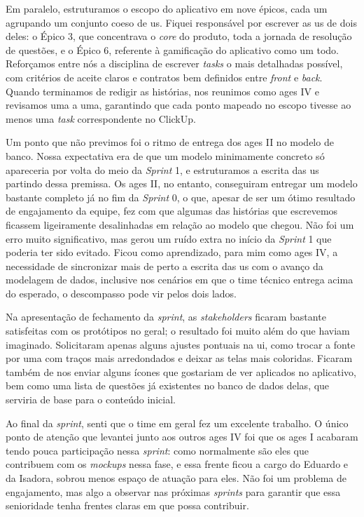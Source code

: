Em paralelo, estruturamos o escopo do aplicativo em nove épicos, cada um agrupando um conjunto coeso de \ac{us}. Fiquei responsável por escrever as \ac{us} de dois deles: o Épico 3, que concentrava o \textit{core} do produto, toda a jornada de resolução de questões, e o Épico 6, referente à gamificação do aplicativo como um todo. Reforçamos entre nós a disciplina de escrever \textit{tasks} o mais detalhadas possível, com critérios de aceite claros e contratos bem definidos entre \textit{front} e \textit{back}. Quando terminamos de redigir as histórias, nos reunimos como \ac{ages} IV e revisamos uma a uma, garantindo que cada ponto mapeado no escopo tivesse ao menos uma \textit{task} correspondente no ClickUp.

Um ponto que não previmos foi o ritmo de entrega dos \ac{ages} II no modelo de banco. Nossa expectativa era de que um modelo minimamente concreto só apareceria por volta do meio da \textit{Sprint} 1, e estruturamos a escrita das \ac{us} partindo dessa premissa. Os \ac{ages} II, no entanto, conseguiram entregar um modelo bastante completo já no fim da \textit{Sprint} 0, o que, apesar de ser um ótimo resultado de engajamento da equipe, fez com que algumas das histórias que escrevemos ficassem ligeiramente desalinhadas em relação ao modelo que chegou. Não foi um erro muito significativo, mas gerou um ruído extra no início da \textit{Sprint} 1 que poderia ter sido evitado. Ficou como aprendizado, para mim como \ac{ages} IV, a necessidade de sincronizar mais de perto a escrita das \ac{us} com o avanço da modelagem de dados, inclusive nos cenários em que o time técnico entrega acima do esperado, o descompasso pode vir pelos dois lados.

Na apresentação de fechamento da \textit{sprint}, as \textit{stakeholders} ficaram bastante satisfeitas com os protótipos no geral; o resultado foi muito além do que haviam imaginado. Solicitaram apenas alguns ajustes pontuais na \ac{ui}, como trocar a fonte por uma com traços mais arredondados e deixar as telas mais coloridas. Ficaram também de nos enviar alguns ícones que gostariam de ver aplicados no aplicativo, bem como uma lista de questões já existentes no banco de dados delas, que serviria de base para o conteúdo inicial.

Ao final da \textit{sprint}, senti que o time em geral fez um excelente trabalho. O único ponto de atenção que levantei junto aos outros \ac{ages} IV foi que os \ac{ages} I acabaram tendo pouca participação nessa \textit{sprint}: como normalmente são eles que contribuem com os \textit{mockups} nessa fase, e essa frente ficou a cargo do Eduardo e da Isadora, sobrou menos espaço de atuação para eles. Não foi um problema de engajamento, mas algo a observar nas próximas \textit{sprints} para garantir que essa senioridade tenha frentes claras em que possa contribuir.
